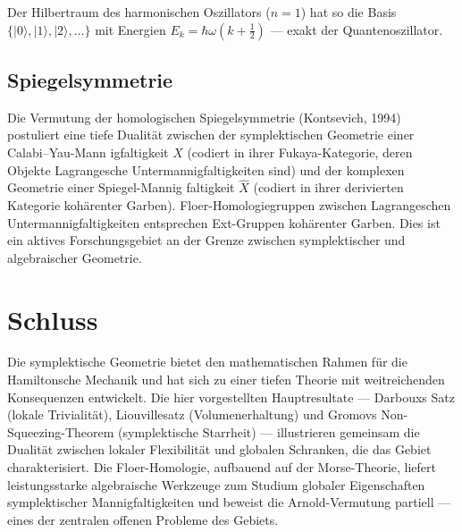 \documentclass[12pt,a4paper]{amsart}
\theoremstyle{definition}
\begin{document}
Der Hilbertraum des harmonischen Oszillators ($n = 1$) hat so die Basis
$\{|0\rangle, |1\rangle, |2\rangle, \ldots\}$ mit Energien
$E_k = \hbar\omega(k + \frac{1}{2})$ --- exakt der Quantenoszillator.

\subsection{Spiegelsymmetrie}

Die Vermutung der homologischen Spiegelsymmetrie (Kontsevich, 1994) postuliert
eine tiefe Dualität zwischen der symplektischen Geometrie einer Calabi--Yau-Mann\-
igfaltigkeit $X$ (codiert in ihrer Fukaya-Kategorie, deren Objekte Lagrangesche
Untermannigfaltigkeiten sind) und der komplexen Geometrie einer Spiegel-Mannig\-
faltigkeit $\hat{X}$ (codiert in ihrer derivierten Kategorie kohärenter Garben).
Floer-Homologiegruppen zwischen Lagrangeschen Untermannigfaltigkeiten
entsprechen Ext-Gruppen kohärenter Garben.  Dies ist ein aktives Forschungsgebiet
an der Grenze zwischen symplektischer und algebraischer Geometrie.

\section*{Schluss}

Die symplektische Geometrie bietet den mathematischen Rahmen für die Hamiltonsche
Mechanik und hat sich zu einer tiefen Theorie mit weitreichenden Konsequenzen
entwickelt.  Die hier vorgestellten Hauptresultate --- Darbouxs Satz (lokale
Trivialität), Liouvillesatz (Volumenerhaltung) und Gromovs Non-Squeezing-Theorem
(symplektische Starrheit) --- illustrieren gemeinsam die Dualität zwischen
lokaler Flexibilität und globalen Schranken, die das Gebiet charakterisiert.
Die Floer-Homologie, aufbauend auf der Morse-Theorie, liefert leistungsstarke
algebraische Werkzeuge zum Studium globaler Eigenschaften symplektischer
Mannigfaltigkeiten und beweist die Arnold-Vermutung partiell --- eines der
zentralen offenen Probleme des Gebiets.
\end{document}
